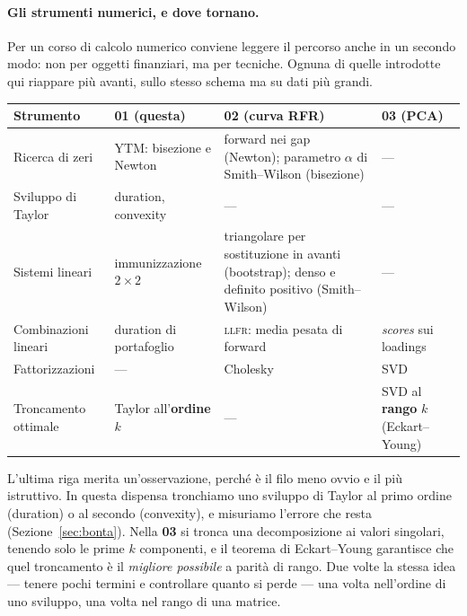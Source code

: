 \documentclass[11pt,a4paper]{article}
\theoremstyle{plain}
\theoremstyle{definition}
\theoremstyle{remark}
\newcommand{\YTM}{\mathrm{YTM}}
\begin{document}
\paragraph{Gli strumenti numerici, e dove tornano.}
Per un corso di calcolo numerico conviene leggere il percorso anche in un secondo modo: non
per oggetti finanziari, ma per tecniche. Ognuna di quelle introdotte qui riappare più avanti,
sullo stesso schema ma su dati più grandi.

\begin{center}
\small
\renewcommand{\arraystretch}{1.35}
\begin{tabular}{@{}p{3.0cm} p{3.1cm} p{4.4cm} p{3.2cm}@{}}
\toprule
\textbf{Strumento} & \textbf{01} (questa) & \textbf{02} (curva RFR) & \textbf{03} (PCA)\\
\midrule
\rowcolor{rowtint}
Ricerca di zeri & $\YTM$: bisezione e Newton & forward nei gap (Newton); parametro $\alpha$ di
Smith--Wilson (bisezione) & ---\\
Sviluppo di Taylor & duration, convexity & --- & ---\\
\rowcolor{rowtint}
Sistemi lineari & immunizzazione $2\times2$ & triangolare per sostituzione in avanti
(bootstrap); denso e definito positivo (Smith--Wilson) & ---\\
Combinazioni lineari & duration di portafoglio & \textsc{llfr}: media pesata di forward &
\emph{scores} sui loadings\\
\rowcolor{rowtint}
Fattorizzazioni & --- & Cholesky & SVD\\
Troncamento ottimale & Taylor all'\textbf{ordine} $k$ & --- & SVD al \textbf{rango} $k$
(Eckart--Young)\\
\bottomrule
\end{tabular}
\end{center}

L'ultima riga merita un'osservazione, perché è il filo meno ovvio e il più istruttivo. In
questa dispensa tronchiamo uno sviluppo di Taylor al primo ordine (duration) o al secondo
(convexity), e misuriamo l'errore che resta (Sezione~\ref{sec:bonta}). Nella \textbf{03} si
tronca una decomposizione ai valori singolari, tenendo solo le prime $k$ componenti, e il
teorema di Eckart--Young garantisce che quel troncamento è il \emph{migliore possibile} a
parità di rango. Due volte la stessa idea --- tenere pochi termini e controllare quanto si
perde --- una volta nell'ordine di uno sviluppo, una volta nel rango di una matrice.

\end{document}

